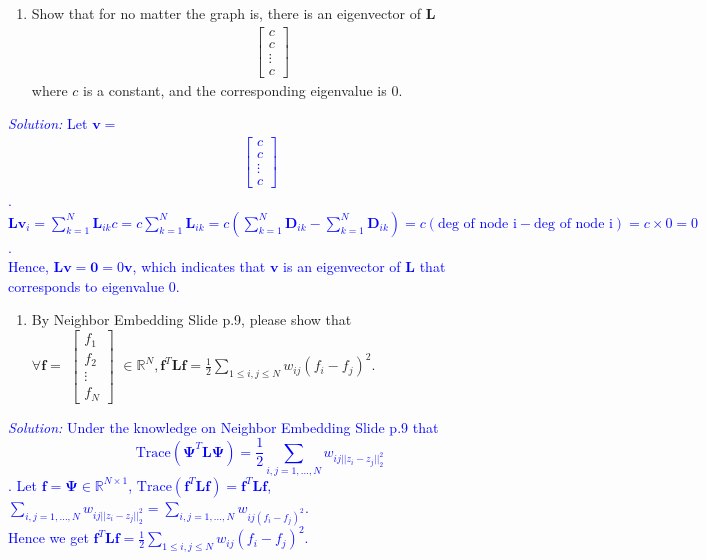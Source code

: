 \documentclass{article}
\def\solColor{blue}
\begin{document}
\begin{enumerate}[resume]

\item Show that for no matter the graph is, there is an eigenvector of $\boldsymbol{L}$ 
\begin{align}
    \begin{bmatrix}
       c \\
       c \\
       \vdots \\
       c
     \end{bmatrix}
  \end{align}
  where $c$ is a constant, and the corresponding eigenvalue is 0.

\end{enumerate}

\textcolor{\solColor}{\textit{Solution:}
Let $\boldsymbol{v}=$
\begin{align}
    \begin{bmatrix}
       c \\
       c \\
       \vdots \\
       c
     \end{bmatrix}
\end{align}. \\
$\boldsymbol{L}\boldsymbol{v}_i = \sum_{k=1}^N \boldsymbol{L}_{ik}c = c\sum_{k=1}^N \boldsymbol{L}_{ik} = c (\sum_{k=1}^N \boldsymbol{D}_{ik} - \sum_{k=1}^N \boldsymbol{D}_{ik}) = c(\text{deg of node i} - \text{deg of node i}) = c \times 0 = 0$. \\
Hence, $\boldsymbol{L}\boldsymbol{v} = \boldsymbol{0} = 0\boldsymbol{v}$, which indicates that $\boldsymbol{v}$ is an eigenvector of $\boldsymbol{L}$ that corresponds to eigenvalue $0$.
}

\begin{enumerate}[resume]

\item By Neighbor Embedding Slide p.9, please show that \\
$ \forall \boldsymbol{f} =$
$\begin{bmatrix}
   f_1 \\
   f_2 \\
   \vdots \\
   f_N
\end{bmatrix}$
$\in \mathbb{R}^N, \boldsymbol{f}^T \boldsymbol{L} \boldsymbol{f}=\frac{1}{2}\sum\limits_{1 \leq i,j \leq N} w_{ij}(f_i-f_j)^2$.

\end{enumerate}
\textcolor{\solColor}{\textit{Solution:}
Under the knowledge on Neighbor Embedding Slide p.9 that 
\[ \text{Trace}(\boldsymbol{\Psi}^T\boldsymbol{L}\boldsymbol{\Psi}) = \frac{1}{2} \sum_{i,j=1,...,N} w_{ij ||z_i-z_j||_2^2}\].
Let $\boldsymbol{f} = \boldsymbol{\Psi} \in \mathbb{R}^{N \times 1}$, $\text{Trace}(\boldsymbol{f}^T\boldsymbol{L}\boldsymbol{f}) = \boldsymbol{f}^T\boldsymbol{L}\boldsymbol{f}$, $\sum_{i,j=1,...,N} w_{ij ||z_i-z_j||_2^2} = \sum_{i,j=1,...,N} w_{ij (f_i-f_j)^2}$. \\
Hence we get $\boldsymbol{f}^T \boldsymbol{L} \boldsymbol{f}=\frac{1}{2}\sum\limits_{1 \leq i,j \leq N} w_{ij}(f_i-f_j)^2$.
}
\end{document}
